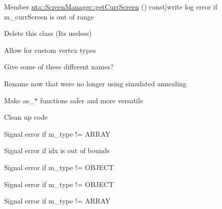 \begin{DoxyRefList}
%
Member \hyperlink{classnta_1_1ScreenManager_a4b26e8adc481bfb37a088e047e4ccc2a}{nta\+:\+:Screen\+Manager\+:\+:get\+Curr\+Screen} () const]write log error if m\+\_\+curr\+Screen is out of range  
\item[\label{todo__todo000011}%
\Hypertarget{todo__todo000011}%
Class \hyperlink{classnta_1_1Sprite}{nta\+:\+:Sprite} ]Delete this class (It\textquotesingle{}s useless)  
\item[\label{todo__todo000012}%
\Hypertarget{todo__todo000012}%
Class \hyperlink{classnta_1_1SpriteBatch}{nta\+:\+:Sprite\+Batch} ]Allow for custom vertex types  
\item[\label{todo__todo000014}%
\Hypertarget{todo__todo000014}%
Member \hyperlink{classnta_1_1SpriteBatch_aa703fb92d0bd42865c21fdfb2625660d}{nta\+:\+:Sprite\+Batch\+:\+:add\+Glyph} (crvec4 pos\+Rect, crvec4 uv\+Rect, G\+Luint texture, float depth=N\+T\+A\+\_\+\+D\+E\+F\+A\+U\+L\+T\+\_\+\+D\+E\+P\+TH, crvec4 color=glm\+::vec4(1))]Give some of these different names?  
\item[\label{todo__todo000031}%
\Hypertarget{todo__todo000031}%
Member \hyperlink{classnta_1_1SpriteFont_a9dc96f31efd0830dcb476ea87534e358}{nta\+:\+:Sprite\+Font\+:\+:Sprite\+Font} (crstring font\+Path, unsigned int size)]Rename now that we\textquotesingle{}re no longer using simulated annealing  
\item[\label{todo__todo000007}%
\Hypertarget{todo__todo000007}%
Class \hyperlink{classnta_1_1utils_1_1Json}{nta\+:\+:utils\+:\+:Json} ]Make as\+\_\+$\ast$ functions safer and more versatile 
\item[\label{todo__todo000025}%
\Hypertarget{todo__todo000025}%
Member \hyperlink{classnta_1_1utils_1_1Json_ab0e60f7a55d12aab005d420c8f924035}{nta\+:\+:utils\+:\+:Json\+:\+:dump} (std\+::size\+\_\+t indent=0, std\+::size\+\_\+t offset=0) const]Clean up code  
\item[\label{todo__todo000021}%
\Hypertarget{todo__todo000021}%
Member \hyperlink{classnta_1_1utils_1_1Json_a236b5885612b74c21fbad169b21eaf55}{nta\+:\+:utils\+:\+:Json\+:\+:operator\mbox{[}\mbox{]}} (std\+::size\+\_\+t idx)]Signal error if m\+\_\+type != A\+R\+R\+AY 

Signal error if idx is out of bounds  
\item[\label{todo__todo000019}%
\Hypertarget{todo__todo000019}%
Member \hyperlink{classnta_1_1utils_1_1Json_adf2d340a2bf7d59c537e398a1be66cf7}{nta\+:\+:utils\+:\+:Json\+:\+:operator\mbox{[}\mbox{]}} (crstring key)]Signal error if m\+\_\+type != O\+B\+J\+E\+CT  
\item[\label{todo__todo000020}%
\Hypertarget{todo__todo000020}%
Member \hyperlink{classnta_1_1utils_1_1Json_ab3b51a07ebed90330c98fd8e20785781}{nta\+:\+:utils\+:\+:Json\+:\+:operator\mbox{[}\mbox{]}} (crstring key) const]Signal error if m\+\_\+type != O\+B\+J\+E\+CT  
\item[\label{todo__todo000023}%
\Hypertarget{todo__todo000023}%
Member \hyperlink{classnta_1_1utils_1_1Json_a893f191111e604995488d147aaa711f8}{nta\+:\+:utils\+:\+:Json\+:\+:operator\mbox{[}\mbox{]}} (std\+::size\+\_\+t idx) const]Signal error if m\+\_\+type != A\+R\+R\+AY 


\end{DoxyRefList}
